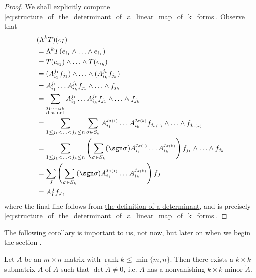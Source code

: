 \documentclass[notoc,notitlepage]{tufte-book}
\DeclareMathOperator{\rank}{rank}
\begin{document}
\begin{proof}
  We shall explicitly compute
  \cref{eq:structure_of_the_determinant_of_a_linear_map_of_k_forms}. Observe
  that
  \begin{align*}
    &(\Lambda^k T)(e_I) \\
    &= \Lambda^k T (e_{i_1} \land \hdots \land e_{i_k}) \\
    &= T(e_{i_1}) \land \hdots \land T(e_{i_k}) \\
    &= (A^{j_1}_{i_1} f_{j_1}) \land \hdots \land (A^{j_k}_{i_k} f_{j_k}) \\
    &= A^{j_1}_{i_1} \hdots A^{j_k}_{i_k} f_{j_1} \land \hdots \land f_{j_k} \\
    &= \sum_{\substack{j_1, \ldots, j_k \\ \text{distinct}}} A^{j_1}_{i_1}
      \hdots A^{j_k}_{i_k} f_{j_1} \land \hdots \land f_{j_k} \\
    &= \sum_{1 \leq j_1 < \hdots < j_k \leq n} \sum_{\sigma \in S_k}
      A^{j_{\sigma(1)}}_{i_1} \hdots A^{j_{\sigma(k)}}_{i_k} f_{j_{\sigma(1)}}
      \land \hdots \land f_{j_{\sigma(k)}} \\
    &= \sum_{1 \leq j_1 < \hdots < j_k \leq n} \left( \sum_{\sigma \in S_k}
      (\sgn \sigma) A^{j_{\sigma(1)}}_{i_1} \hdots A^{j_{\sigma(k)}}_{i_k}
      \right) f_{j_1} \land \hdots \land f_{j_k} \\
    &= \sum_{J} \left( \sum_{\sigma \in S_k} (\sgn \sigma)
      A^{j_{\sigma(1)}}_{i_1} \hdots A^{j_{\sigma(k)}}_{i_k} \right) f_J \\
    &= A^J_I f_J,
  \end{align*}
  where the final line follows from \hyperref[defn:determinant]{the definition
  of a determinant}, and is precisely
  \cref{eq:structure_of_the_determinant_of_a_linear_map_of_k_forms}.
\end{proof}

The following corollary is important to us, not now, but later on when we begin
the section .

\begin{crly}\label{crly:nonvanishing_minor}
  Let $A$ be an $m \times n$ matrix with $\rank k \leq \min \{ m, n \}$. Then
  there exists a $k \times k$ submatrix $\tilde{A}$ of $A$ such that $\det
  \tilde{A} \neq 0$, i.e. $A$ has a nonvanishing $k \times k$ minor $\tilde{A}$.
\end{crly}
\end{document}
